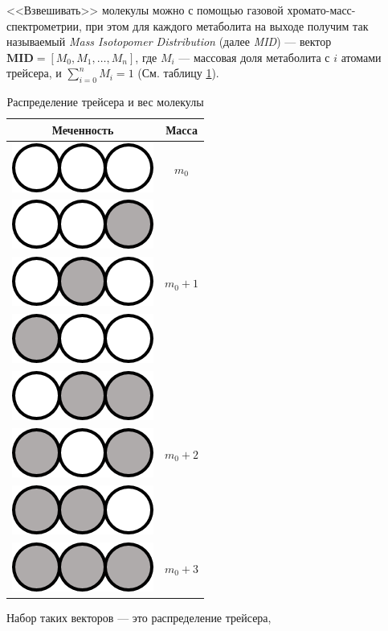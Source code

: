 \documentclass[14pt, a4paper]{extreport}
\begin{document}
<<Взвешивать>> молекулы можно с помощью газовой хромато-масс-\\спектрометрии, при этом для каждого метаболита на выходе получим так называемый \emph{Mass Isotopomer Distribution} (далее \emph{MID}) --- вектор $\mathbf{MID} = [M_0, M_1, \ldots, M_n]$, где $M_i$ --- массовая доля метаболита с $i$ атомами трейсера, и $\sum_{i = 0}^{n} M_i= 1$ (См. таблицу \ref{MID}).

 \begin{table}
	\renewcommand{\arraystretch}{1.5}
	\begin{tabular}{c | c}
		\hline
		Меченность & Масса\\ 
		\hline
		\includegraphics{emus/000.png} & $m_0$\\
		\hline
		\includegraphics{emus/001.png} & \\
		\includegraphics{emus/010.png} & $m_0 + 1$\\
		\includegraphics{emus/100.png} & \\
		\hline
		\includegraphics{emus/011.png} & \\
		\includegraphics{emus/101.png} & $m_0 + 2$\\
		\includegraphics{emus/110.png} & \\
		\hline
		\includegraphics{emus/111.png} & $m_0 + 3$\\
	\end{tabular}
	\caption{Распределение трейсера и вес молекулы}
	\label{MID}
\end{table} Набор таких векторов --- это распределение трейсера, 
\end{document}

